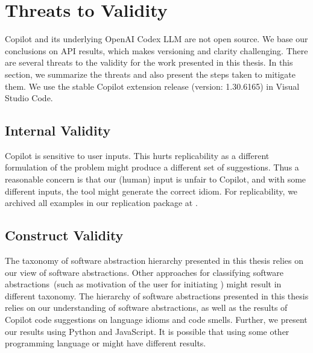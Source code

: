 \section{Threats to Validity}
\label{limitations}
Copilot and its underlying OpenAI Codex LLM are not open source. 
We base our conclusions on API results, which makes versioning and clarity challenging. There are several threats to the validity for the work presented in this thesis. In this section, we summarize the threats and also present the steps taken to mitigate them. We use the stable Copilot extension release (version: 1.30.6165) in Visual Studio Code. %

\subsection{Internal Validity}
Copilot is sensitive to user inputs. This hurts replicability as a different formulation of the problem might produce a different set of suggestions. 
Thus a reasonable concern is that our (human) input is unfair to Copilot, and with some different inputs, the tool might generate the correct idiom. 
For replicability, we archived all examples in our replication package at \repl{}.

\subsection{Construct Validity}
The taxonomy of software abstraction hierarchy presented in this thesis relies on our view of software abstractions.
Other approaches for classifying software abstractions~(such as motivation of the user for initiating \cct{}) might result in different taxonomy.
The hierarchy of software abstractions presented in this thesis relies on our understanding of software abstractions, as well as the results of Copilot code suggestions on language idioms and code smells. Further, we present our results using Python and JavaScript. It is possible that using some other programming language or \cct{} might have different results.

